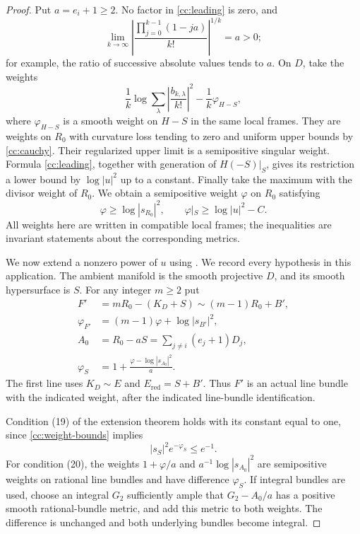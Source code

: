 \begin{proof}
Put $a=e_i+1\ge2$.  No factor in \eqref{cc:leading} is zero, and
\[
 \lim_{k\to\infty}
 \left|\frac{\prod_{j=0}^{k-1}(1-ja)}{k!}\right|^{1/k}=a>0;
\]
for example, the ratio of successive absolute values tends to $a$.
On $D$, take the weights
\[
 \frac1k\log\sum_\lambda
       \left|\frac{b_{k,\lambda}}{k!}\right|^2
       -\frac1k\varphi_{H-S},
\]
where $\varphi_{H-S}$ is a smooth weight on $H-S$ in the same
local frames. They are weights on $R_0$ with curvature loss tending
to zero and uniform upper bounds by \eqref{cc:cauchy}.  Their
regularized upper limit is a semipositive singular weight.  Formula
\eqref{cc:leading}, together with generation of $H(-S)|_S$, gives its
restriction a lower bound by $\log|u|^2$ up to a constant.  Finally take
the maximum with the divisor weight of $R_0$.  We obtain a semipositive
weight $\varphi$ on $R_0$ satisfying
\begin{equation}
      \varphi\ge\log|s_{R_0}|^2,\qquad
      \varphi|_S\ge\log|u|^2-C.
\label{cc:weight-bounds}
\end{equation}
All weights here are written in compatible local frames; the
inequalities are invariant statements about the corresponding metrics.

We now extend a nonzero power of $u$ using
\cite[Theorem~4.1, conditions~(19)--(23)]{DHP13}.  We record every
hypothesis in this application.  The ambient manifold is the smooth
projective $D$, and its smooth hypersurface is $S$.  For any integer
$m\ge2$ put
\begin{equation}
 \begin{split}
  F'&=mR_0-(K_D+S)\sim (m-1)R_0+B',\\
  \varphi_{F'}&=(m-1)\varphi+\log|s_{B'}|^2,\\
  A_0&=R_0-aS=\sum_{j\ne i}(e_j+1)D_j,\\
  \varphi_S&=1+\frac{\varphi-\log|s_{A_0}|^2}{a}.
 \end{split}
\label{cc:extension-weights}
\end{equation}
The first line uses $K_D\sim E$ and
$E_{\mathrm{red}}=S+B'$.  Thus $F'$ is an actual line bundle with the
indicated weight, after the indicated line-bundle identification.

Condition (19) of the extension theorem holds with its constant equal
to one, since \eqref{cc:weight-bounds} implies
\[
                  |s_S|^2e^{-\varphi_S}\le e^{-1}.
\]
For condition (20), the weights $1+\varphi/a$ and
$a^{-1}\log|s_{A_0}|^2$ are semipositive weights on rational line
bundles and have difference $\varphi_S$.  If integral bundles are used,
choose an integral $G_2$ sufficiently ample that $G_2-A_0/a$ has a
positive smooth rational-bundle metric, and add this metric to both
weights.  The difference is unchanged and both underlying bundles
become integral.


\end{proof}
